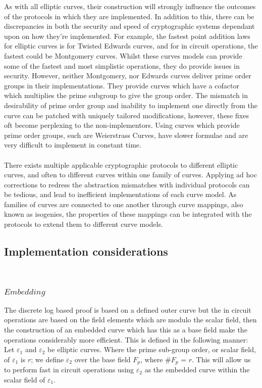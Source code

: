 \documentclass{article}
\begin{document}
As with all elliptic curves, their construction will strongly influence the outcomes of the protocols in which they are implemented. In addition to this, there can be discrepancies in both the security and speed of cryptographic systems dependant upon on how they're implemented. For example, the fastest point addition laws for elliptic curves is for Twisted Edwards curves, and for in circuit operations, the fastest could be Montgomery curves. Whilst these curves models can provide some of the fastest and most simplistic operations, they do provide issues in security. However, neither Montgomery, nor Edwards curves deliver prime order groups in their implementations. They provide curves which have a cofactor which multiplies the prime subgroup to give the group order. The mismatch in desirability of prime order group and inability to implement one directly from the curve can be patched with uniquely tailored modifications, however, these fixes oft become perplexing to the non-implementors. Using curves which provide prime order groups, such are Weierstrass Curves, have slower formulae and are very difficult to implement in constant time. \\\\ 
There exists multiple applicable cryptographic protocols to different elliptic curves, and often to different curves within one family of curves. Applying ad hoc corrections to redress the abstraction mismatches with individual protocols can be tedious, and lead to inefficient implementations of each curve model. As families of curves are connected to one another through curve mappings, also known as isogenies, the properties of these mappings can be integrated with the protocols to extend them to different curve models.




\subsection{Implementation considerations}

\\ \subsubsection{$Embedding$}
 The discrete log based proof is based on a defined outer curve but the in circuit operations are based on the field elements which are modulo the scalar field, then the construction of an embedded curve which has this as a base field make the operations considerably more efficient. This is defined in the following manner: Let $\varepsilon_{1}$ and $\varepsilon_{2}$ be elliptic curves. Where the prime sub-group order, or scalar field, of $\varepsilon_{1}$ is $r$; we define $\varepsilon_{2}$ over the base field $F_p$, where \#$F_p$ = $r$. 
This will allow us to perform fast in circuit operations using $\varepsilon_{2}$ as the embedded curve within the scalar field of $\varepsilon_{1}$.\\\\
\end{document}

